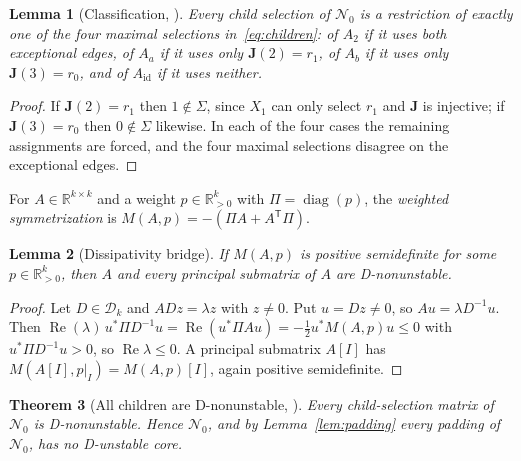 \documentclass[11pt,a4paper]{article}
\theoremstyle{plain}
\newtheorem{theorem}{Theorem}[section]
\newtheorem{lemma}[theorem]{Lemma}
\theoremstyle{definition}
\theoremstyle{remark}
\newcommand{\R}{\mathbb{R}}
\newcommand{\diag}{\operatorname{diag}}
\newcommand{\Real}{\operatorname{Re}}
\begin{document}
\begin{lemma}[Classification, {\cite[Lemma~4.1]{Companion2026}}]\label{lem:classification}
Every child selection of $\mathcal N_0$ is a restriction of exactly one of the four maximal selections in~\eqref{eq:children}: of $A_2$ if it uses both exceptional edges, of $A_a$ if it uses only $\mathbf J(2)=r_1$, of $A_b$ if it uses only $\mathbf J(3)=r_0$, and of $A_{\mathrm{id}}$ if it uses neither.
\end{lemma}

\begin{proof}
If $\mathbf J(2)=r_1$ then $1\notin\Sigma$, since $X_1$ can only select $r_1$ and $\mathbf J$ is injective; if $\mathbf J(3)=r_0$ then $0\notin\Sigma$ likewise. In each of the four cases the remaining assignments are forced, and the four maximal selections disagree on the exceptional edges.
\end{proof}

For $A\in\R^{k\times k}$ and a weight $p\in\R^k_{>0}$ with $\Pi=\diag(p)$, the \emph{weighted symmetrization} is $M(A,p)=-(\Pi A+A^{\mathsf T}\Pi)$.

\begin{lemma}[Dissipativity bridge]\label{lem:dissipative}
If $M(A,p)$ is positive semidefinite for some $p\in\R^k_{>0}$, then $A$ and every principal submatrix of $A$ are D-nonunstable.
\end{lemma}

\begin{proof}
Let $D\in\mathcal D_k$ and $ADz=\lambda z$ with $z\neq0$. Put $u=Dz\ne0$, so $Au=\lambda D^{-1}u$. Then $\Real(\lambda)\,u^*\Pi D^{-1}u=\Real(u^*\Pi Au)=-\tfrac12u^*M(A,p)u\le0$ with $u^*\Pi D^{-1}u>0$, so $\Real\lambda\le0$. A principal submatrix $A[I]$ has $M(A[I],p|_I)=M(A,p)[I]$, again positive semidefinite.
\end{proof}

\begin{theorem}[All children are D-nonunstable, {\cite[Thm.~4.7]{Companion2026}}]\label{thm:children}
Every child-selection matrix of $\mathcal N_0$ is D-nonunstable. Hence $\mathcal N_0$, and by Lemma~\ref{lem:padding} every padding of $\mathcal N_0$, has no D-unstable core.
\end{theorem}
\end{document}

